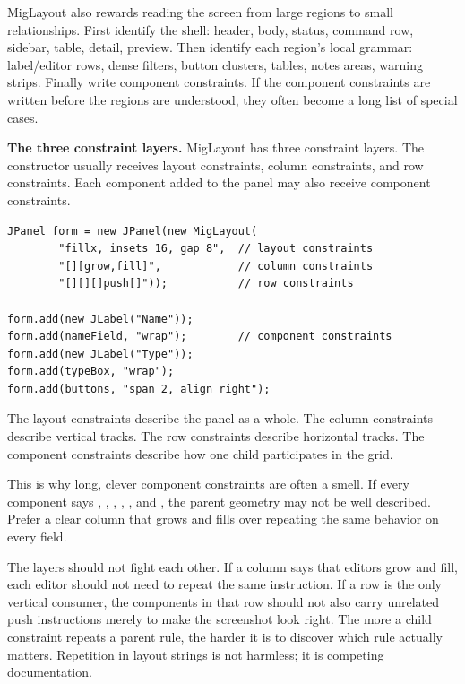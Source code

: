 MigLayout also rewards reading the screen from large regions to small
relationships. First identify the shell: header, body, status, command row,
sidebar, table, detail, preview. Then identify each region's local grammar:
label/editor rows, dense filters, button clusters, tables, notes areas, warning
strips. Finally write component constraints. If the component constraints are
written before the regions are understood, they often become a long list of
special cases.

\textbf{The three constraint layers.}
MigLayout has three constraint layers. The constructor usually receives layout constraints, column constraints, and row constraints. Each component added to the panel may also receive component constraints.

\begin{lstlisting}[caption={The three MigLayout constructor constraints plus component constraints.}]
JPanel form = new JPanel(new MigLayout(
        "fillx, insets 16, gap 8",  // layout constraints
        "[][grow,fill]",            // column constraints
        "[][][]push[]"));           // row constraints

form.add(new JLabel("Name"));
form.add(nameField, "wrap");        // component constraints
form.add(new JLabel("Type"));
form.add(typeBox, "wrap");
form.add(buttons, "span 2, align right");
\end{lstlisting}

The layout constraints describe the panel as a whole. The column constraints describe vertical tracks. The row constraints describe horizontal tracks. The component constraints describe how one child participates in the grid.

This is why long, clever component constraints are often a smell. If every component says , , , , , and , the parent geometry may not be well described. Prefer a clear column that grows and fills over repeating the same behavior on every field.

The layers should not fight each other. If a column says that editors grow and
fill, each editor should not need to repeat the same instruction. If a row is
the only vertical consumer, the components in that row should not also carry
unrelated push instructions merely to make the screenshot look right. The more a
child constraint repeats a parent rule, the harder it is to discover which rule
actually matters. Repetition in layout strings is not harmless; it is competing
documentation.

